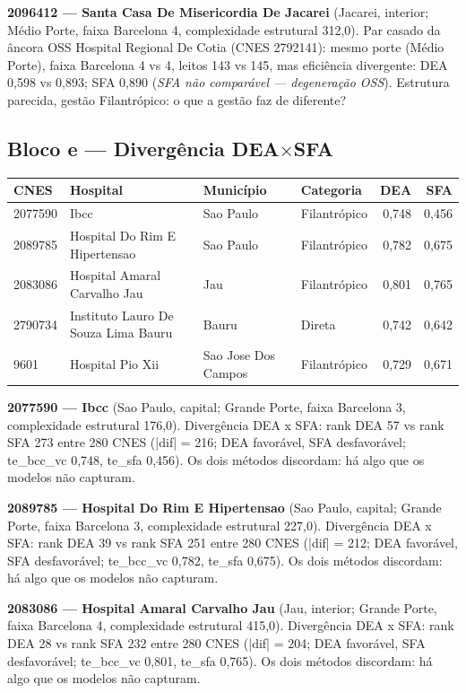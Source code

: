 \documentclass[12pt,a4paper]{article}
\begin{document}
\noindent\textbf{2096412 --- Santa Casa De Misericordia De Jacarei} (Jacarei, interior; Médio Porte, faixa Barcelona 4, complexidade estrutural 312,0). Par casado da âncora OSS Hospital Regional De Cotia (CNES 2792141): mesmo porte (Médio Porte), faixa Barcelona 4 vs 4, leitos 143 vs 145, mas eficiência divergente: DEA 0,598 vs 0,893; SFA 0,890 (\emph{SFA não comparável --- degeneração OSS}). Estrutura parecida, gestão Filantrópico: o que a gestão faz de diferente?\par\medskip

\subsection{Bloco e --- Divergência DEA$\times$SFA}
\begin{center}\small
\begin{tabular}{llllrr}
\toprule
CNES & Hospital & Município & Categoria & DEA & SFA \\
\midrule
2077590 & Ibcc & Sao Paulo & Filantrópico & 0,748 & 0,456 \\
2089785 & Hospital Do Rim E Hipertensao & Sao Paulo & Filantrópico & 0,782 & 0,675 \\
2083086 & Hospital Amaral Carvalho Jau & Jau & Filantrópico & 0,801 & 0,765 \\
2790734 & Instituto Lauro De Souza Lima Bauru & Bauru & Direta & 0,742 & 0,642 \\
9601 & Hospital Pio Xii & Sao Jose Dos Campos & Filantrópico & 0,729 & 0,671 \\
\bottomrule
\end{tabular}
\end{center}
\noindent\textbf{2077590 --- Ibcc} (Sao Paulo, capital; Grande Porte, faixa Barcelona 3, complexidade estrutural 176,0). Divergência DEA x SFA: rank DEA 57 vs rank SFA 273 entre 280 CNES (|dif| = 216; DEA favorável, SFA desfavorável; te\_bcc\_vc 0,748, te\_sfa 0,456). Os dois métodos discordam: há algo que os modelos não capturam.\par\medskip
\noindent\textbf{2089785 --- Hospital Do Rim E Hipertensao} (Sao Paulo, capital; Grande Porte, faixa Barcelona 3, complexidade estrutural 227,0). Divergência DEA x SFA: rank DEA 39 vs rank SFA 251 entre 280 CNES (|dif| = 212; DEA favorável, SFA desfavorável; te\_bcc\_vc 0,782, te\_sfa 0,675). Os dois métodos discordam: há algo que os modelos não capturam.\par\medskip
\noindent\textbf{2083086 --- Hospital Amaral Carvalho Jau} (Jau, interior; Grande Porte, faixa Barcelona 4, complexidade estrutural 415,0). Divergência DEA x SFA: rank DEA 28 vs rank SFA 232 entre 280 CNES (|dif| = 204; DEA favorável, SFA desfavorável; te\_bcc\_vc 0,801, te\_sfa 0,765). Os dois métodos discordam: há algo que os modelos não capturam.\par\medskip
\end{document}
